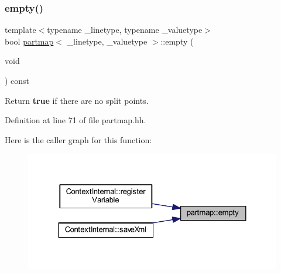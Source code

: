 \mbox{\label{classpartmap_acb22171bf61ae4106332972b6fc30791}} 
\subsubsection{\texorpdfstring{empty()}{empty()}}
{\footnotesize\ttfamily template$<$typename \+\_\+linetype, typename \+\_\+valuetype$>$ \\
bool \mbox{\hyperlink{classpartmap}{partmap}}$<$ \+\_\+linetype, \+\_\+valuetype $>$\+::empty (\begin{DoxyParamCaption}\item[{void}]{ }\end{DoxyParamCaption}) const\hspace{0.3cm}{\ttfamily [inline]}}



Return {\bfseries{true}} if there are no split points. 



Definition at line 71 of file partmap.\+hh.

Here is the caller graph for this function\+:
\nopagebreak
\begin{figure}[H]
\begin{center}
\leavevmode
\includegraphics[width=324pt]{classpartmap_acb22171bf61ae4106332972b6fc30791_icgraph}
\end{center}
\end{figure}
\mbox{\label{classpartmap_a2bff6a7424e587f2e29ea8a7fcf81a43}} 
